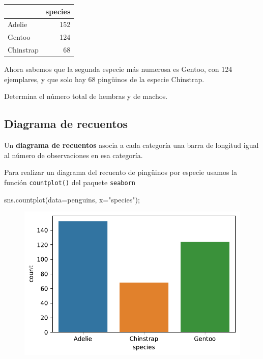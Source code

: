\documentclass[
  a4paper,
  noprof,
  12pt,
  notoc,
  nosols,
  nobib]{mnye}
\newenvironment{Shaded}{\begin{snugshade}}{\end{snugshade}}
\newcommand{\NormalTok}[1]{\textcolor[rgb]{0.00,0.23,0.31}{#1}}
\newcommand{\OperatorTok}[1]{\textcolor[rgb]{0.37,0.37,0.37}{#1}}
\newcommand{\StringTok}[1]{\textcolor[rgb]{0.13,0.47,0.30}{#1}}
\renewenvironment{exercise}[1][]{
            \if\relax\detokenize{#1}\relax
                \ex
            \else
                \ex[note={#1}]
            \fi
        }{\endex}
\theoremstyle{definition}
\newtheorem{exercise}{Ejercicio}[section]
\theoremstyle{remark}
\begin{document}
\begin{tabular}{lr}
\toprule
{} &  species \\
\midrule
Adelie    &      152 \\
Gentoo    &      124 \\
Chinstrap &       68 \\
\bottomrule
\end{tabular}

Ahora sabemos que la segunda especie más numerosa es Gentoo, con 124
ejemplares, y que solo hay 68 pingüinos de la especie Chinstrap.

\begin{exercise}[]%
\protect\hypertarget{exr-1categorial-sex-counts}{}\label{exr-1categorial-sex-counts}%
Determina el número total de hembras y de machos.

\end{exercise}

\hypertarget{diagrama-de-recuentos}{%
\subsection{Diagrama de recuentos}\label{diagrama-de-recuentos}}

Un \textbf{diagrama de recuentos} asocia a cada categoría una barra de
longitud igual al número de observaciones en esa categoría.

Para realizar un diagrama del recuento de pingüinos por especie usamos
la función \texttt{countplot()} del paquete \texttt{seaborn}

\begin{Shaded}
\begin{Highlighting}[]
\NormalTok{sns.countplot(data}\OperatorTok{=}\NormalTok{penguins, x}\OperatorTok{=}\StringTok{"species"}\NormalTok{)}\OperatorTok{;}
\end{Highlighting}
\end{Shaded}

\begin{figure}[tbph]

{\centering \includegraphics{chapters/1categorical_files/figure-pdf/cell-6-output-1.pdf}

}

\end{figure}
\end{document}
